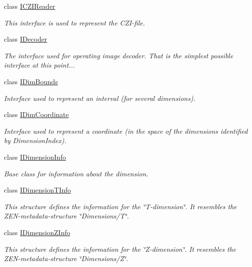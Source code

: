 \begin{DoxyCompactItemize}
class \hyperlink{classlib_c_z_i_1_1_i_c_z_i_reader}{I\+C\+Z\+I\+Reader}
\begin{DoxyCompactList}\small\item\em This interface is used to represent the C\+Z\+I-\/file. \end{DoxyCompactList}\item 
class \hyperlink{classlib_c_z_i_1_1_i_decoder}{I\+Decoder}
\begin{DoxyCompactList}\small\item\em The interface used for operating image decoder. That is the simplest possible interface at this point... \end{DoxyCompactList}\item 
class \hyperlink{classlib_c_z_i_1_1_i_dim_bounds}{I\+Dim\+Bounds}
\begin{DoxyCompactList}\small\item\em Interface used to represent an interval (for several dimensions). \end{DoxyCompactList}\item 
class \hyperlink{classlib_c_z_i_1_1_i_dim_coordinate}{I\+Dim\+Coordinate}
\begin{DoxyCompactList}\small\item\em Interface used to represent a coordinate (in the space of the dimensions identified by {\ttfamily Dimension\+Index}). \end{DoxyCompactList}\item 
class \hyperlink{classlib_c_z_i_1_1_i_dimension_info}{I\+Dimension\+Info}
\begin{DoxyCompactList}\small\item\em Base class for information about the dimension. \end{DoxyCompactList}\item 
class \hyperlink{classlib_c_z_i_1_1_i_dimension_t_info}{I\+Dimension\+T\+Info}
\begin{DoxyCompactList}\small\item\em This structure defines the information for the \char`\"{}\+T-\/dimension\char`\"{}. It resembles the Z\+E\+N-\/metadata-\/structure \char`\"{}\+Dimensions/\+T\char`\"{}. \end{DoxyCompactList}\item 
class \hyperlink{classlib_c_z_i_1_1_i_dimension_z_info}{I\+Dimension\+Z\+Info}
\begin{DoxyCompactList}\small\item\em This structure defines the information for the \char`\"{}\+Z-\/dimension\char`\"{}. It resembles the Z\+E\+N-\/metadata-\/structure \char`\"{}\+Dimensions/\+Z\char`\"{}. \end{DoxyCompactList}\item 

\end{DoxyCompactItemize}
